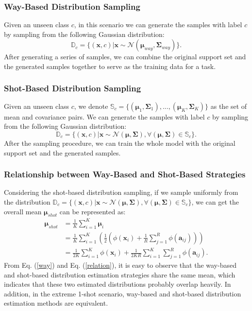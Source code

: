 \documentclass[letterpaper]{article} %
\begin{document}
\subsubsection{Way-Based Distribution Sampling} Given an unseen class $c$, in this scenario we can generate the samples with label $c$ by sampling from the following Gaussian distribution:
\begin{equation}
    \mathbb{D}_c = \{(\bm{x}, c) | \bm{x} \sim \mathcal{N}(\boldsymbol{\mu}_{way}, \bm{\Sigma}_{way})\}.
\end{equation}
After generating a series of samples, we can combine the original support set and the generated samples together to serve as the training data for a task.

\subsubsection{Shot-Based Distribution Sampling} Given an unseen class $c$, we denote $\mathbb{S}_c = \{(\boldsymbol{\mu}_1, \bm{\Sigma}_1), ...,  (\boldsymbol{\mu}_K, \bm{\Sigma}_K)\}$ as the set of mean and covariance pairs. We can generate the samples with label $c$ by sampling from the following Gaussian distribution:
\begin{equation}
	\mathbb{D}_c = \{(\bm{x}, c) | \bm{x} \sim \mathcal{N}(\boldsymbol{ \mu}, \bm{\Sigma}), \forall (\boldsymbol{ \mu}, \bm{\Sigma}) \in \mathbb{S}_c\}.
\end{equation}
After the sampling procedure, we can train the whole model with the original support set and the generated samples.

\subsubsection{Relationship between Way-Based and Shot-Based Strategies}
Considering the shot-based distribution sampling, if we sample uniformly from the distribution $\mathbb{D}_c = \{(\bm{x}, c) | \bm{x} \sim \mathcal{N}(\boldsymbol{ \mu}, \bm{\Sigma}), \forall (\boldsymbol{ \mu}, \bm{\Sigma}) \in \mathbb{S}_c\}$, we can get the overall mean $\bm{\mu}_{shot}$ can be represented as:
\begin{equation}\label{relation}
\begin{split}
	\bm{\mu}_{shot} & = \frac{1}{K}\sum_{i=1}^{K}\bm{\mu}_i \\
& = \frac{1}{K}\sum_{i=1}^{K}(\frac{1}{2}(\phi(\bm x_i)+\frac{1}{R}\sum_{j=1}^{R}\phi(\bm{a}_{ij})))\\
& = \frac{1}{2K}\sum_{i=1}^{K} \phi(\bm{x}_i) + \frac{1}{2KR} \sum_{i=1}^{K} \sum_{j=1}^{R} \phi(\bm{a}_{ij}).
\end{split}
\end{equation}
From Eq. (\ref{way}) and Eq. (\ref{relation}), it is easy to observe that the way-based and shot-based distribution estimation strategies share the same mean, which indicates that these two estimated distributions probably overlap heavily. In addition, in 
the extreme 1-shot scenario, way-based and shot-based distribution estimation methods are equivalent.
\end{document}
